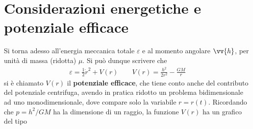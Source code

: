 \documentclass[a4paper, oneside]{book}
\begin{document}
\section{Considerazioni energetiche e potenziale efficace}
Si torna adesso all'energia meccanica totale $\varepsilon$ e al momento 
angolare $\vv{h}$, per unità di massa (ridotta) $\mu$. Si può dunque scrivere che 
\begin{align}
    \boxed{\varepsilon = \frac{1}{2}\dot{r}^{2} + V(r) \qquad V(r) = \frac{h^{2}}{2r^{2}} - \frac{GM}{r}}
\end{align} 
si è chiamato $V(r)$ il \textbf{potenziale efficace}, che tiene 
conto anche del contributo del potenziale centrifuga, avendo 
in pratica ridotto un problema bidimensionale ad uno monodimensionale, 
dove compare solo la variabile $r = r(t)$. Ricordando che 
$p = h^{2}/GM$ ha la dimensione di un raggio, la funzione 
$V(r)$ ha un grafico del tipo 
\end{document}
